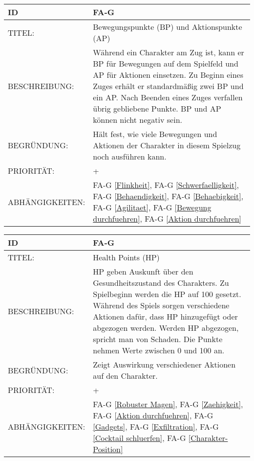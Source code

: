 \begin{tabularx}{16cm}{l|X}
	{table}\label{BP und AP}
	\textbf{ID} & \textbf{FA-G \arabic{table}} \\
	\hline
	TITEL: & Bewegungspunkte (BP) und Aktionspunkte (AP) \\
	\hline
	BESCHREIBUNG: & Während ein Charakter am Zug ist, kann er BP für Bewegungen auf dem Spielfeld und AP für Aktionen einsetzen.
	Zu Beginn eines Zuges erhält er standardmäßig zwei BP und ein AP. Nach Beenden eines Zuges verfallen übrig gebliebene Punkte. BP und AP können nicht negativ sein.\\
	\hline
	BEGRÜNDUNG: & Hält fest, wie viele Bewegungen und Aktionen der Charakter in diesem Spielzug noch ausführen kann. \\
	\hline
	PRIORITÄT: & +\\ 
	\hline
	ABHÄNGIGKEITEN: & FA-G \ref{Flinkheit}, FA-G \ref{Schwerfaelligkeit}, FA-G \ref{Behaendigkeit}, FA-G \ref{Behaebigkeit}, FA-G \ref{Agilitaet}, FA-G \ref{Bewegung durchfuehren}, FA-G \ref{Aktion durchfuehren}\\
\end{tabularx}

\begin{tabularx}{16cm}{l|X}
	{table}\label{HP}
	\textbf{ID} & \textbf{FA-G \arabic{table}} \\
	\hline
	TITEL: & Health Points (HP) \\
	\hline
	BESCHREIBUNG: & HP geben Auskunft über den Gesundheitszustand des Charakters. Zu Spielbeginn werden die HP auf 100 gesetzt. Während des Spiels sorgen verschiedene Aktionen dafür, dass HP hinzugefügt oder abgezogen werden. Werden HP abgezogen, spricht man von Schaden. Die Punkte nehmen Werte zwischen 0 und 100 an.\\
	\hline
	BEGRÜNDUNG: & Zeigt Auswirkung verschiedener Aktionen auf den Charakter. \\
	\hline
	PRIORITÄT: & +\\
	\hline
	ABHÄNGIGKEITEN: & FA-G \ref{Robuster Magen}, FA-G \ref{Zaehigkeit}, FA-G \ref{Aktion durchfuehren}, FA-G \ref{Gadgets}, FA-G \ref{Exfiltration}, FA-G \ref{Cocktail schluerfen}, FA-G \ref{Charakter-Position}\\
\end{tabularx}

